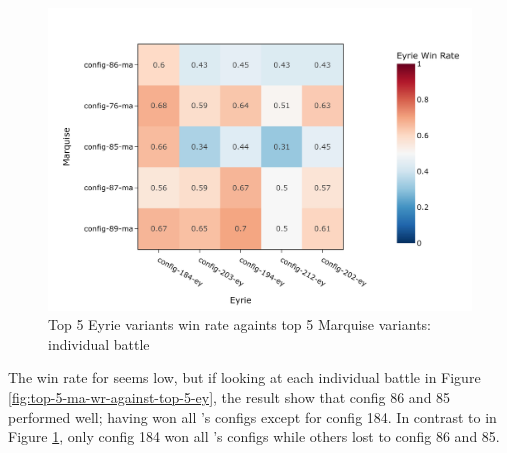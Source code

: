 \begin{figure}[h!]
    \begin{center}
        \includegraphics[width=\textwidth]{./images/fig-stage-2-eyrie-win-rate.jpeg}
    \end{center}
    \caption{Top 5 Eyrie variants win rate againts top 5 Marquise variants: individual battle}
    \label{fig:top-5-ey-wr-against-top-5-ma}
\end{figure}

The win rate for \Marquise{} seems low, but if looking at each individual battle in Figure \ref{fig:top-5-ma-wr-against-top-5-ey}, the result show that config 86 and 85 performed well; having won all \Eyrie{}'s configs except for config 184. In contrast to \Eyrie{} in Figure \ref{fig:top-5-ey-wr-against-top-5-ma}, only config 184 won all \Marquise{}'s configs while others lost to config 86 and 85.

